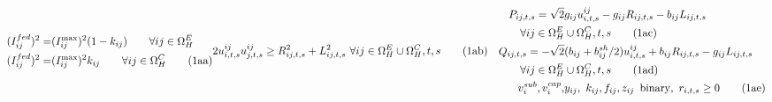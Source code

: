 \documentclass[journal]{IEEEtran}
\theoremstyle{remark}
\begin{document}
\begin{subequations}
\begin{align}
(I_{ij}^{fed})^2 = &   (I_{ij}^{\max })^2(1 - {k_{ij}})      \qquad\forall ij \in \Omega _H^E         \label{eq_a24}\\
(I_{ij}^{fed})^2 = & (I_{ij}^{\max })^2 k_{ij}         \qquad\forall ij \in \Omega _H^C     \tag{1aa}    \label{eq_a25}
\end{align}
\begin{align}
2u_{i,t,s}^{ij}u_{j,t,s}^{ij} &\ge R^2_{ij,t,s} + L^2_{ij,t,s}      \ \forall ij \in \Omega _H^E \cup \Omega _H^C,t,s    \tag{1ab}  \label{eq_a26}
\end{align}
\begin{align}
 P_{ij,t,s}  = \sqrt 2 & g_{ij}u_{i,t,s}^{ij} - {g_{ij}}{R_{ij,t,s}} - b_{ij}L_{ij,t,s}  \nonumber\\
 \forall ij \in \Omega_H^E & \cup \Omega_H^C,t,s    \tag{1ac}  \label{eq_a27}\\
Q_{ij,t,s} =  - \sqrt 2 &   (b_{ij} + b_{ij}^{sh}/2)u_{i,t,s}^{ij} + b_{ij}R_{ij,t,s} - {g_{ij}}{L_{ij,t,s}} \nonumber \\
\forall ij \in \Omega_H^E & \cup \Omega_H^C,t,s \tag{1ad}  \label{eq_a28}\\
 v_i^{sub},v_i^{cap}, & {y_{ij}}, \,\,{k_{ij}},{f_{ij}},{z_{ij}}\,\,\,{\rm{binary}},\,\,r_{i,t,s} \ge 0    \tag{1ae}        \label{eq_a29}
\end{align}
\end{subequations}
\end{document}
